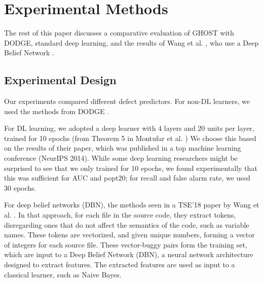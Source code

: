\documentclass[10pt,compsoc,twocolumn]{IEEEtran}
\begin{document}

\section{Experimental Methods}
\label{sec:method}

The rest of this paper
discusses a comparative evaluation
of GHOST with DODGE, standard deep learning, and the results of Wang et al. \cite{wang2018deep}, who use a Deep Belief Network \cite{hinton2009deep}.



\subsection{Experimental Design}

Our experiments  compared different defect predictors. For non-DL learners, we used the  methods from DODGE \cite{agrawal2019dodge}.


 For DL learning, we adopted a deep learner with 4 layers and 20 units per layer, trained for 10 epochs (from Theorem 5 in Montufar et al. \cite{montufar2014number}) We choose this based on the results of their paper, which was published in a top machine learning conference (NeurIPS 2014). While some deep learning researchers might be surprised to see that we only trained for 10 epochs, we found experimentally that this was sufficient for AUC and popt20; for recall and false alarm rate, we used 30 epochs.

 For deep belief networks (DBN), the methods seen in a TSE'18 paper  by
Wang et al. \cite{wang2018deep}. 
In that approach,
for each file in the source code, they extract tokens, disregarding ones that do not affect the semantics of the code, such as variable names. 
These tokens are vectorized, and given unique numbers, forming a vector of integers for each source file. 
These vector-buggy pairs form the training set, which are input to a Deep Belief Network (DBN), a neural network architecture designed to extract features. The extracted features are used as input to a classical learner, such as Naive Bayes. 
\end{document}

